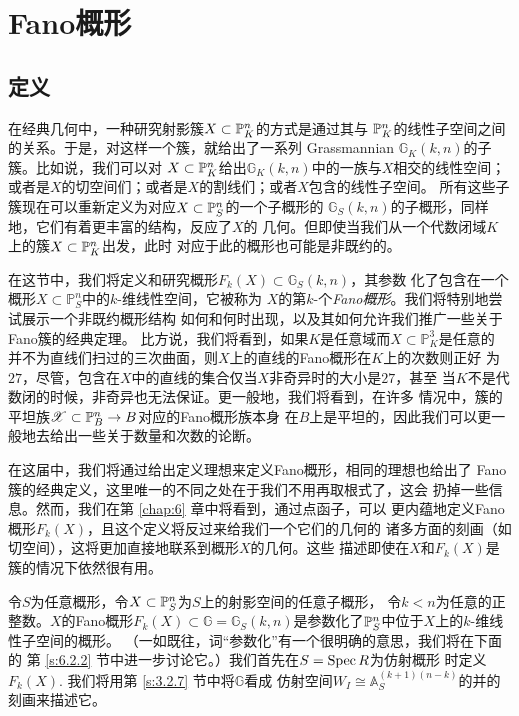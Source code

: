 \section{Fano概形}\label{s:4.3}
\subsection{定义}\label{s:4.3.1}

在经典几何中，一种研究射影簇$X\subset \bbp_K^n$的方式是通过其与
$\bbp_K^n$的线性子空间之间的关系。于是，对这样一个簇，就给出了一系列
Grassmannian $\mathbb G_K(k,n)$的子簇。比如说，我们可以对
$X\subset \bbp_K^n$给出$\mathbb G_K(k,n)$中的一族与$X$相交的线性空间；
或者是$X$的切空间们；或者是$X$的割线们；或者$X$包含的线性子空间。
所有这些子簇现在可以重新定义为对应$X\subset \bbp_S^n$的一个子概形的
$\mathbb G_S(k,n)$的子概形，同样地，它们有着更丰富的结构，反应了$X$的
几何。但即使当我们从一个代数闭域$K$上的簇$X\subset \bbp_K^n$出发，此时
对应于此的概形也可能是非既约的。

在这节中，我们将定义和研究概形$F_k(X)\subset \mathbb G_S(k,n)$，其参数
化了包含在一个概形$X\subset \mathbb P_S^n$中的$k$-维线性空间，它被称为
$X$的第$k$-个\textit{Fano概形}。我们将特别地尝试展示一个非既约概形结构
如何和何时出现，以及其如何允许我们推广一些关于Fano簇的经典定理。
比方说，我们将看到，如果$K$是任意域而$X\subset \mathbb P_K^3$是任意的
并不为直线们扫过的三次曲面，则$X$上的直线的Fano概形在$K$上的次数则正好
为$27$，尽管，包含在$X$中的直线的集合仅当$X$非奇异时的大小是$27$，甚至
当$K$不是代数闭的时候，非奇异也无法保证。更一般地，我们将看到，在许多
情况中，簇的平坦族$\mathscr X\subset \P_B^n\to B$对应的Fano概形族本身
在$B$上是平坦的，因此我们可以更一般地去给出一些关于数量和次数的论断。

在这届中，我们将通过给出定义理想来定义Fano概形，相同的理想也给出了
Fano簇的经典定义，这里唯一的不同之处在于我们不用再取根式了，这会
扔掉一些信息。然而，我们在第 \ref{chap:6} 章中将看到，通过点函子，可以
更内蕴地定义Fano概形$F_k(X)$，且这个定义将反过来给我们一个它们的几何的
诸多方面的刻画（如切空间），这将更加直接地联系到概形$X$的几何。这些
描述即使在$X$和$F_k(X)$是簇的情况下依然很有用。


令$S$为任意概形，令$X\subset \P_S^n$为$S$上的射影空间的任意子概形，
令$k<n$为任意的正整数。$X$的Fano概形$F_k(X)\subset \mathbb G=
\mathbb G_S(k,n)$是参数化了$\P_S^n$中位于$X$上的$k$-维线性子空间的概形。
（一如既往，词“参数化”有一个很明确的意思，我们将在下面的
第 \ref{s:6.2.2} 节中进一步讨论它。）我们首先在$S=\spec R$为仿射概形
时定义$F_k(X)$. 我们将用第 \ref{s:3.2.7} 节中将$\mathbb G$看成
仿射空间$W_I\cong \mathbb A_S^{(k+1)(n-k)}$的并的刻画来描述它。

